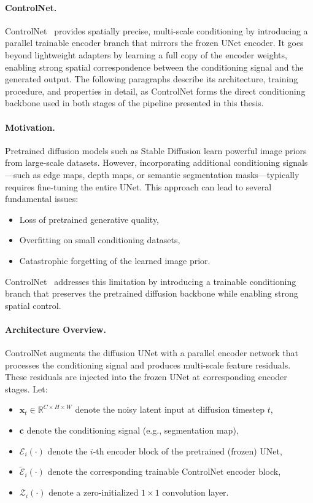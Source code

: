 \paragraph{ControlNet.}
ControlNet~\cite{zhang2023adding} provides spatially precise, multi-scale conditioning by introducing a parallel trainable encoder branch that mirrors the frozen UNet encoder. It goes beyond lightweight adapters by learning a full copy of the encoder weights, enabling strong spatial correspondence between the conditioning signal and the generated output. The following paragraphs describe its architecture, training procedure, and properties in detail, as ControlNet forms the direct conditioning backbone used in both stages of the pipeline presented in this thesis.

\paragraph{Motivation.}
Pretrained diffusion models such as Stable Diffusion learn powerful image priors from large-scale datasets. However, incorporating additional conditioning signals---such as edge maps, depth maps, or semantic segmentation masks---typically requires fine-tuning the entire UNet. This approach can lead to several fundamental issues:
\begin{itemize}
    \item Loss of pretrained generative quality,
    \item Overfitting on small conditioning datasets,
    \item Catastrophic forgetting of the learned image prior.
\end{itemize}
ControlNet~\cite{zhang2023adding} addresses this limitation by introducing a trainable conditioning branch that preserves the pretrained diffusion backbone while enabling strong spatial control.

\paragraph{Architecture Overview.}
ControlNet augments the diffusion UNet with a parallel encoder network that processes the conditioning signal and produces multi-scale feature residuals. These residuals are injected into the frozen UNet at corresponding encoder stages. Let:
\begin{itemize}
    \item $\mathbf{x}_t \in \mathbb{R}^{C \times H \times W}$ denote the noisy latent input at diffusion timestep $t$,
    \item $\mathbf{c}$ denote the conditioning signal (e.g., segmentation map),
    \item $\mathcal{E}_i(\cdot)$ denote the $i$-th encoder block of the pretrained (frozen) UNet,
    \item $\tilde{\mathcal{E}}_i(\cdot)$ denote the corresponding trainable ControlNet encoder block,
    \item $\mathcal{Z}_i(\cdot)$ denote a zero-initialized $1 \times 1$ convolution layer.
\end{itemize}

